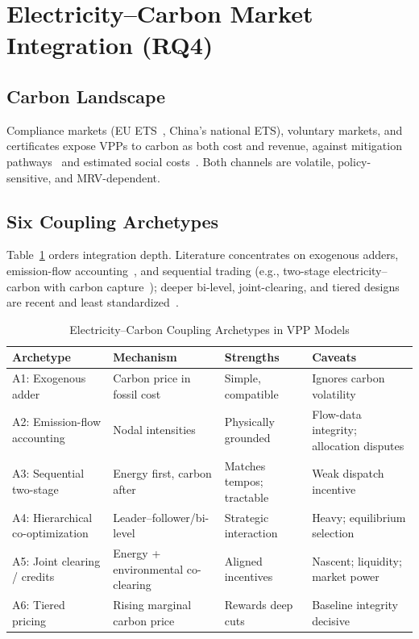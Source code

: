 \documentclass[journal]{IEEEtran}
\begin{document}
\section{Electricity--Carbon Market Integration (RQ4)}
\subsection{Carbon Landscape}
Compliance markets (EU ETS~\cite{eudirective2003}, China's national ETS), voluntary markets, and certificates expose VPPs to carbon as both cost and revenue, against mitigation pathways~\cite{ipcc2022} and estimated social costs~\cite{nordhaus2017}. Both channels are volatile, policy-sensitive, and MRV-dependent.

\subsection{Six Coupling Archetypes}
Table~\ref{tab:coupling} orders integration depth. Literature concentrates on exogenous adders, emission-flow accounting~\cite{kang2012,kang2015}, and sequential trading (e.g., two-stage electricity--carbon with carbon capture~\cite{liu2023}); deeper bi-level, joint-clearing, and tiered designs are recent and least standardized~\cite{zare2026}.

\begin{table}[htbp]
\caption{Electricity--Carbon Coupling Archetypes in VPP Models}
\label{tab:coupling}
\centering
\begin{tabular}{p{3.2cm}p{4.6cm}p{3.4cm}p{3.6cm}}
\toprule
\textbf{Archetype} & \textbf{Mechanism} & \textbf{Strengths} & \textbf{Caveats} \\
\midrule
A1: Exogenous adder & Carbon price in fossil cost & Simple, compatible & Ignores carbon volatility \\
A2: Emission-flow accounting & Nodal intensities~\cite{kang2012,kang2015} & Physically grounded & Flow-data integrity; allocation disputes \\
A3: Sequential two-stage & Energy first, carbon after~\cite{liu2023} & Matches tempos; tractable & Weak dispatch incentive \\
A4: Hierarchical co-optimization & Leader--follower/bi-level & Strategic interaction & Heavy; equilibrium selection \\
A5: Joint clearing / credits & Energy + environmental co-clearing & Aligned incentives & Nascent; liquidity; market power \\
A6: Tiered pricing & Rising marginal carbon price & Rewards deep cuts & Baseline integrity decisive \\
\bottomrule
\end{tabular}
\end{table}
\end{document}
